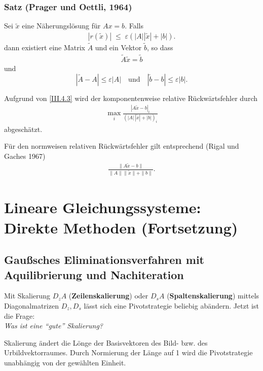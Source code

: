 \documentclass[ngerman,fontsize=11pt, paper=a4, parskip=half, titlepage=true, toc=bib]{scrbook}
\newcommand{\sectione}[1]{\section{#1} \setcounter{equation}{0}}
\begin{document}
  	\subsection{Satz (Prager und Oettli, 1964)} \label{3.4.1}
  	  Sei $\tilde{ x}$ eine Näherungslösung für 
  	  $  A  x =  b$. 
  	  Falls
  	  \begin{gather}\label{III.4.3}
  	  |  r(\tilde { x})|  \; \leq \; \varepsilon ( | A| | \tilde { x} | + |  b|).
  	  \end{gather}
  	  dann existiert eine Matrix $\tilde{ A}$  und ein
  	  Vektor $\tilde { b}$, so dass
  	  \begin{gather*}
  	  	\tilde{ A} \tilde { x}  =  \tilde{ b} 
  	  \end{gather*}
  	  und
  	  \begin{equation}
  	  |\tilde{ A} -  A |  \leq  \varepsilon | A|
  	  \quad \textrm{und} \quad | \tilde{ b} -  b| \leq
  	  \varepsilon | b|.
  	  \label{III.4.4}
  	  \end{equation}
  	  
  	  Aufgrund von \eqref{III.4.3} wird der komponentenweise relative
  	  Rückwärtsfehler durch 
  	  \begin{gather*}
  	  	 \max_i \frac{|  A \tilde{ x} -  b|_i}
  	  	 { (| A|\, |\tilde{ x}| + | b|)_i} 
  	  \end{gather*}
  	  abgeschätzt.
  	  
  	  Für den normweisen relativen Rückwärtsfehler gilt entsprechend
  	  (Rigal und Gaches 1967)
  	  \begin{gather*}
  	  	\frac{\|  A \tilde{ x} -  b\|}
  	  	{ \| A\| \|\tilde{ x} \| + \| b\| } .
  	  \end{gather*}
  
  
  \chapter{Lineare Gleichungssysteme: Direkte Methoden (Fortsetzung)}
  
  \sectione{Gaußsches Eliminationsverfahren mit Aquilibrierung und Nachiteration}
  
  Mit Skalierung $D_zA$ (\textbf{Zeilenskalierung}) oder
  $D_sA$ (\textbf{Spaltenskalierung})
  mittels Diagonalmatrizen $D_z, D_s$ lässt sich eine Pivotstrategie beliebig abändern.
  Jetzt ist die Frage: \\
  \textit{Was ist eine \enquote{gute} Skalierung?}
  
  Skalierung ändert die Lönge der Basisvektoren des Bild- bzw. des Urbildvektorraumes.
  Durch Normierung der Länge auf 1 wird die Pivotstrategie unabhängig von der 
  gewählten Einheit.
  
\end{document}
